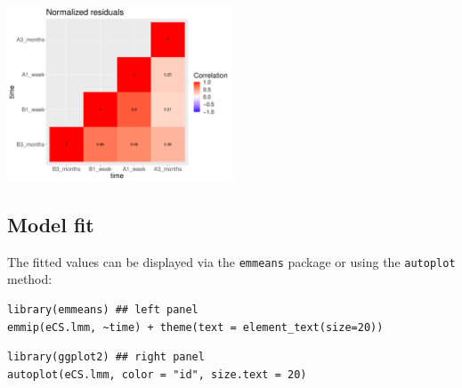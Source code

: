 \documentclass[12pt]{article}
\begin{document}
\begin{center}
\includegraphics[width=0.5\textwidth]{./figures/diag-correlation.pdf}
\end{center}


\subsection{Model fit}
\label{sec:org5bc3728}

The fitted values can be displayed via the \texttt{emmeans} package or using the \texttt{autoplot} method:
\lstset{language=r,label= ,caption= ,captionpos=b,numbers=none}
\begin{lstlisting}
library(emmeans) ## left panel
emmip(eCS.lmm, ~time) + theme(text = element_text(size=20))
\end{lstlisting}

\lstset{language=r,label= ,caption= ,captionpos=b,numbers=none}
\begin{lstlisting}
library(ggplot2) ## right panel
autoplot(eCS.lmm, color = "id", size.text = 20)
\end{lstlisting}
\end{document}
